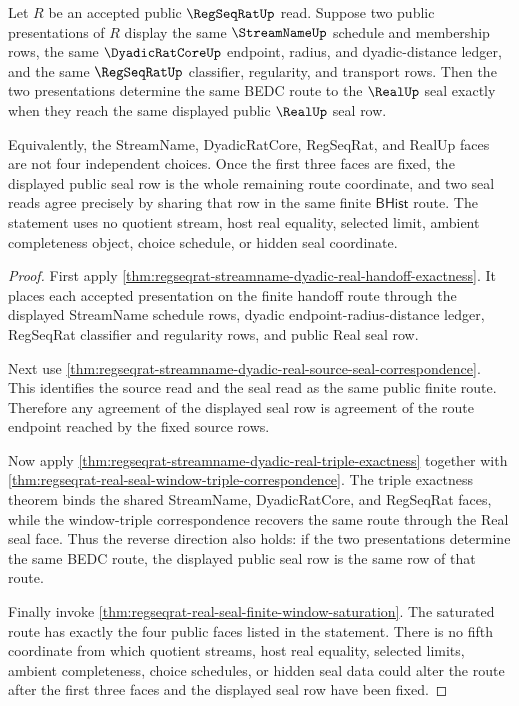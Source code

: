 \begin{theorem}
\label{thm:regseqrat-streamname-real-three-surface-route-determinacy}
Let $R$ be an accepted public $\RegSeqRatUp$ read. Suppose two public
presentations of $R$ display the same $\StreamNameUp$ schedule and membership
rows, the same $\DyadicRatCoreUp$ endpoint, radius, and dyadic-distance
ledger, and the same $\RegSeqRatUp$ classifier, regularity, and transport
rows. Then the two presentations determine the same BEDC route to the
$\RealUp$ seal exactly when they reach the same displayed public $\RealUp$
seal row.

Equivalently, the StreamName, DyadicRatCore, RegSeqRat, and RealUp faces are
not four independent choices. Once the first three faces are fixed, the
displayed public seal row is the whole remaining route coordinate, and two
seal reads agree precisely by sharing that row in the same finite
$\mathsf{BHist}$ route. The statement uses no quotient stream, host real
equality, selected limit, ambient completeness object, choice schedule, or
hidden seal coordinate.
\end{theorem}
\begin{proof}
First apply
\autoref{thm:regseqrat-streamname-dyadic-real-handoff-exactness}. It places
each accepted presentation on the finite handoff route through the displayed
StreamName schedule rows, dyadic endpoint-radius-distance ledger, RegSeqRat
classifier and regularity rows, and public Real seal row.

Next use
\autoref{thm:regseqrat-streamname-dyadic-real-source-seal-correspondence}.
This identifies the source read and the seal read as the same public finite
route. Therefore any agreement of the displayed seal row is agreement of the
route endpoint reached by the fixed source rows.

Now apply
\autoref{thm:regseqrat-streamname-dyadic-real-triple-exactness} together with
\autoref{thm:regseqrat-real-seal-window-triple-correspondence}. The triple
exactness theorem binds the shared StreamName, DyadicRatCore, and RegSeqRat
faces, while the window-triple correspondence recovers the same route through
the Real seal face. Thus the reverse direction also holds: if the two
presentations determine the same BEDC route, the displayed public seal row is
the same row of that route.

Finally invoke
\autoref{thm:regseqrat-real-seal-finite-window-saturation}. The saturated
route has exactly the four public faces listed in the statement. There is no
fifth coordinate from which quotient streams, host real equality, selected
limits, ambient completeness, choice schedules, or hidden seal data could
alter the route after the first three faces and the displayed seal row have
been fixed.
\end{proof}


